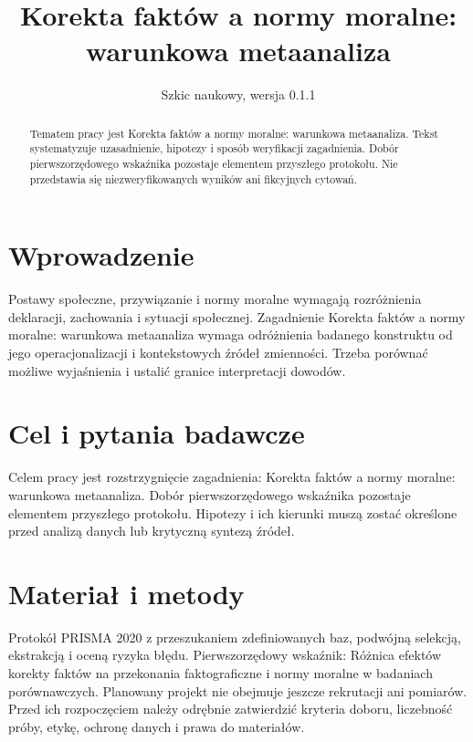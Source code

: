 \documentclass[11pt,a4paper]{article}
\title{Korekta faktów a normy moralne: warunkowa metaanaliza}
\author{}
\date{Szkic naukowy, wersja 0.1.1}
\begin{document}
\maketitle

\begin{abstract}

Tematem pracy jest Korekta faktów a normy moralne: warunkowa metaanaliza. Tekst systematyzuje uzasadnienie, hipotezy i sposób weryfikacji zagadnienia. Dobór pierwszorzędowego wskaźnika pozostaje elementem przyszłego protokołu. Nie przedstawia się niezweryfikowanych wyników ani fikcyjnych cytowań.

\end{abstract}

\section{Wprowadzenie}

Postawy społeczne, przywiązanie i normy moralne wymagają rozróżnienia deklaracji, zachowania i sytuacji społecznej. Zagadnienie Korekta faktów a normy moralne: warunkowa metaanaliza wymaga odróżnienia badanego konstruktu od jego operacjonalizacji i kontekstowych źródeł zmienności. Trzeba porównać możliwe wyjaśnienia i ustalić granice interpretacji dowodów.

\section{Cel i pytania badawcze}

Celem pracy jest rozstrzygnięcie zagadnienia: Korekta faktów a normy moralne: warunkowa metaanaliza. Dobór pierwszorzędowego wskaźnika pozostaje elementem przyszłego protokołu. Hipotezy i ich kierunki muszą zostać określone przed analizą danych lub krytyczną syntezą źródeł.

\section{Materiał i metody}

Protokół PRISMA 2020 z przeszukaniem zdefiniowanych baz, podwójną selekcją, ekstrakcją i oceną ryzyka błędu. Pierwszorzędowy wskaźnik: Różnica efektów korekty faktów na przekonania faktograficzne i normy moralne w badaniach porównawczych. Planowany projekt nie obejmuje jeszcze rekrutacji ani pomiarów. Przed ich rozpoczęciem należy odrębnie zatwierdzić kryteria doboru, liczebność próby, etykę, ochronę danych i prawa do materiałów.
\end{document}
